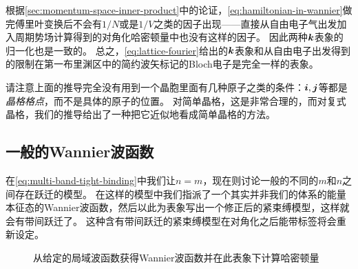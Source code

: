 根据\autoref{sec:momentum-space-inner-product}中的论证，\eqref{eq:hamiltonian-in-wannier}做完傅里叶变换后不会有$1/N$或是$1/V$之类的因子出现——直接从自由电子气出发加入周期势场计算得到的对角化哈密顿量中也没有这样的因子。
因此两种$\vb*{k}$表象的归一化也是一致的。
总之，\eqref{eq:lattice-fourier}给出的$\vb*{k}$表象和从自由电子出发得到的限制在第一布里渊区中的简约波矢标记的Bloch电子是完全一样的表象。

请注意上面的推导完全没有用到一个晶胞里面有几种原子之类的条件：$\vb*{i}, \vb*{j}$等都是\emph{晶格格点}，而不是具体的原子的位置。
对简单晶格，这是非常合理的，而对复式晶格，我们的推导给出了一种把它近似地看成简单晶格的方法。

\subsection{一般的Wannier波函数}

在\eqref{eq:multi-band-tight-binding}中我们让$n=m$，现在则讨论一般的不同的$m$和$n$之间存在跃迁的模型。
在这样的模型中我们指派了一个其实并非我们的体系的能量本征态的Wannier波函数，然后以此为表象写出一个修正后的紧束缚模型，这样就会有带间跃迁了。
这种含有带间跃迁的紧束缚模型在对角化之后能带标签将会重新设定。

\begin{figure}
    \centering
    \caption{从给定的局域波函数获得Wannier波函数并在此表象下计算哈密顿量}
    \label{fig:obtain-wannier-compute-hamiltonian}
\end{figure}

